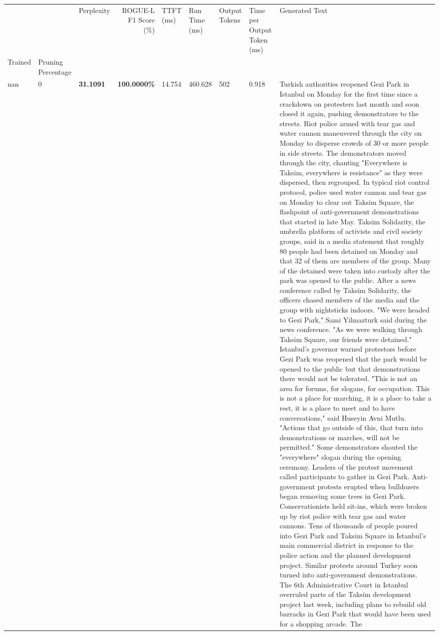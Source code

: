 \begin{table}[H]
\label{tab:evaluation-pipeline-11}
\begin{tabular}{lllrlllll}
\toprule
 &  & Perplexity & ROGUE-L F1 Score (\%) & TTFT (ms) & Run Time (ms) & Output Tokens & Time per Output Token (ms) & Generated Text \\
Trained & Pruning Percentage &  &  &  &  &  &  &  \\
\midrule
nan & 0 & \bfseries 31.1091 & \bfseries 100.0000\% & 14.754 & 460.628 & 502 & 0.918 & Turkish authorities reopened Gezi Park in Istanbul on Monday for the first time since a crackdown on protesters last month and soon closed it again, pushing demonstrators to the streets. Riot police armed with tear gas and water cannon maneuvered through the city on Monday to disperse crowds of 30 or more people in side streets. The demonstrators moved through the city, chanting "Everywhere is Taksim, everywhere is resistance" as they were dispersed, then regrouped. In typical riot control protocol, police used water cannon and tear gas on Monday to clear out Taksim Square, the flashpoint of anti-government demonstrations that started in late May. Taksim Solidarity, the umbrella platform of activists and civil society groups, said in a media statement that roughly 80 people had been detained on Monday and that 32 of them are members of the group. Many of the detained were taken into custody after the park was opened to the public. After a news conference called by Taksim Solidarity, the officers chased members of the media and the group with nightsticks indoors. "We were headed to Gezi Park," Sami Yilmazturk said during the news conference. "As we were walking through Taksim Square, our friends were detained." Istanbul's governor warned protestors before Gezi Park was reopened that the park would be opened to the public but that demonstrations there would not be tolerated. "This is not an area for forums, for slogans, for occupation. This is not a place for marching, it is a place to take a rest, it is a place to meet and to have conversations," said Huseyin Avni Mutlu. "Actions that go outside of this, that turn into demonstrations or marches, will not be permitted." Some demonstrators shouted the "everywhere" slogan during the opening ceremony. Leaders of the protest movement called participants to gather in Gezi Park. Anti-government protests erupted when bulldozers began removing some trees in Gezi Park. Conservationists held sit-ins, which were broken up by riot police with tear gas and water cannons. Tens of thousands of people poured into Gezi Park and Taksim Square in Istanbul's main commercial district in response to the police action and the planned development project. Similar protests around Turkey soon turned into anti-government demonstrations. The 6th Administrative Court in Istanbul overruled parts of the Taksim development project last week, including plans to rebuild old barracks in Gezi Park that would have been used for a shopping arcade. The \\

\end{tabular}
\end{table}

